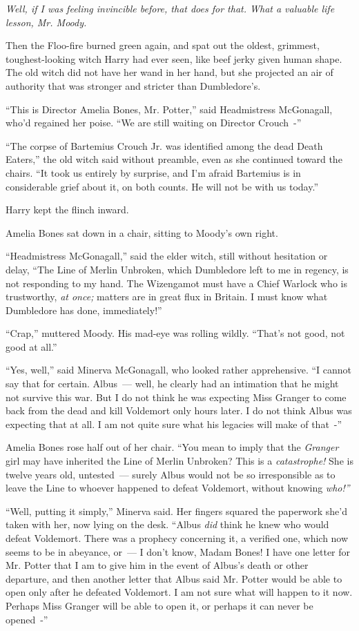 \emph{Well, if I was feeling invincible before, that does for that. What a valuable life lesson, Mr. Moody.}

Then the Floo-fire burned green again, and spat out the oldest, grimmest, toughest-looking witch Harry had ever seen, like beef jerky given human shape. The old witch did not have her wand in her hand, but she projected an air of authority that was stronger and stricter than Dumbledore's.

``This is Director Amelia Bones, Mr. Potter,'' said Headmistress McGonagall, who'd regained her poise. ``We are still waiting on Director Crouch~-''

``The corpse of Bartemius Crouch Jr. was identified among the dead Death Eaters,'' the old witch said without preamble, even as she continued toward the chairs. ``It took us entirely by surprise, and I'm afraid Bartemius is in considerable grief about it, on both counts. He will not be with us today.''

Harry kept the flinch inward.

Amelia Bones sat down in a chair, sitting to Moody's own right.

``Headmistress McGonagall,'' said the elder witch, still without hesitation or delay, ``The Line of Merlin Unbroken, which Dumbledore left to me in regency, is not responding to my hand. The Wizengamot must have a Chief Warlock who is trustworthy, \emph{at once;} matters are in great flux in Britain. I must know what Dumbledore has done, immediately!''

``Crap,'' muttered Moody. His mad-eye was rolling wildly. ``That's not good, not good at all.''

``Yes, well,'' said Minerva McGonagall, who looked rather apprehensive. ``I cannot say that for certain. Albus~--- well, he clearly had an intimation that he might not survive this war. But I do not think he was expecting Miss Granger to come back from the dead and kill Voldemort only hours later. I do not think Albus was expecting that at all. I am not quite sure what his legacies will make of that~-''

Amelia Bones rose half out of her chair. ``You mean to imply that the \emph{Granger} girl may have inherited the Line of Merlin Unbroken? This is a \emph{catastrophe!} She is twelve years old, untested~--- surely Albus would not be so irresponsible as to leave the Line to whoever happened to defeat Voldemort, without knowing \emph{who!''}

``Well, putting it simply,'' Minerva said. Her fingers squared the paperwork she'd taken with her, now lying on the desk. ``Albus \emph{did} think he knew who would defeat Voldemort. There was a prophecy concerning it, a verified one, which now seems to be in abeyance, or~--- I don't know, Madam Bones! I have one letter for Mr. Potter that I am to give him in the event of Albus's death or other departure, and then another letter that Albus said Mr. Potter would be able to open only after he defeated Voldemort. I am not sure what will happen to it now. Perhaps Miss Granger will be able to open it, or perhaps it can never be opened~-''

